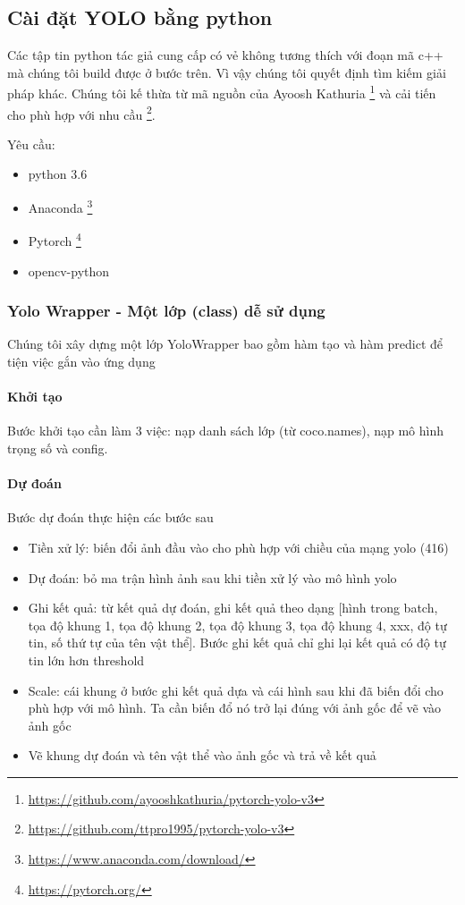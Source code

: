 \subsection{Cài đặt YOLO bằng python}

Các tập tin python tác giả cung cấp có vẻ không tương thích với đoạn mã c++ mà chúng tôi build được ở bước trên. Vì vậy chúng tôi quyết định tìm kiếm giải pháp khác. Chúng tôi kế thừa từ mã nguồn của Ayoosh Kathuria \footnote{\url{https://github.com/ayooshkathuria/pytorch-yolo-v3}} và cải tiến cho phù hợp với nhu cầu \footnote{\url{https://github.com/ttpro1995/pytorch-yolo-v3}}.  

Yêu cầu: 
\begin{itemize}
\item python 3.6
\item Anaconda \footnote{\url{https://www.anaconda.com/download/}}
\item Pytorch \footnote{\url{https://pytorch.org/}}
\item opencv-python 
\end{itemize}

\subsubsection{Yolo Wrapper - Một lớp (class) dễ sử dụng}

Chúng tôi xây dựng một lớp YoloWrapper bao gồm hàm tạo và hàm predict để tiện việc gắn vào ứng dụng 

\paragraph{Khởi tạo}
Bước khởi tạo cần làm 3 việc: nạp danh sách lớp (từ coco.names), nạp mô hình trọng số và config. 

\paragraph{Dự đoán}
Bước dự đoán thực hiện các bước sau 

\begin{itemize}
\item Tiền xử lý: biến đổi ảnh đầu vào cho phù hợp với chiều của mạng yolo (416) 
\item Dự đoán: bỏ ma trận hình ảnh sau khi tiền xử lý vào mô hình yolo 
\item Ghi kết quả: từ kết quả dự đoán, ghi kết quả theo dạng [hình trong batch, tọa độ khung 1, tọa độ khung 2, tọa độ khung 3, tọa độ khung 4, xxx, độ tự tin, số thứ tự của tên vật thể]. Bước ghi kết quả chỉ ghi lại kết quả có độ tự tin lớn hơn threshold 
\item Scale: cái khung ở bước ghi kết quả dựa và cái hình sau khi đã biến đổi cho phù hợp với mô hình. Ta cần biến đổ nó trở lại đúng với ảnh gốc để vẽ vào ảnh gốc 
\item Vẽ khung dự đoán và tên vật thể vào ảnh gốc và trả về kết quả 
\end{itemize} 


